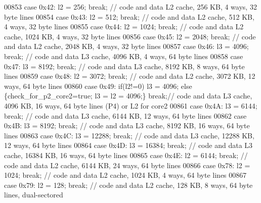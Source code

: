 \begin{DoxyCode}
{00853       \textcolor{keywordflow}{case} 0x42: l2 = 256; \textcolor{keywordflow}{break};   \textcolor{comment}{// code and data L2 cache, 256 KB, 4 ways, 32 byte lines}
00854       \textcolor{keywordflow}{case} 0x43: l2 = 512; \textcolor{keywordflow}{break};   \textcolor{comment}{// code and data L2 cache, 512 KB, 4 ways, 32 byte lines}
00855       \textcolor{keywordflow}{case} 0x44: l2 = 1024; \textcolor{keywordflow}{break};   \textcolor{comment}{// code and data L2 cache, 1024 KB, 4 ways, 32 byte lines}
00856       \textcolor{keywordflow}{case} 0x45: l2 = 2048; \textcolor{keywordflow}{break};   \textcolor{comment}{// code and data L2 cache, 2048 KB, 4 ways, 32 byte lines}
00857       \textcolor{keywordflow}{case} 0x46: l3 = 4096; \textcolor{keywordflow}{break};   \textcolor{comment}{// code and data L3 cache, 4096 KB, 4 ways, 64 byte lines}
00858       \textcolor{keywordflow}{case} 0x47: l3 = 8192; \textcolor{keywordflow}{break};   \textcolor{comment}{// code and data L3 cache, 8192 KB, 8 ways, 64 byte lines}
00859       \textcolor{keywordflow}{case} 0x48: l2 = 3072; \textcolor{keywordflow}{break};   \textcolor{comment}{// code and data L2 cache, 3072 KB, 12 ways, 64 byte lines}
00860       \textcolor{keywordflow}{case} 0x49: \textcolor{keywordflow}{if}(l2!=0) l3 = 4096; \textcolor{keywordflow}{else} \{check\_for\_p2\_core2=\textcolor{keyword}{true}; l3 = l2 = 4096;\} \textcolor{keywordflow}{break};\textcolor{comment}{// code and
       data L3 cache, 4096 KB, 16 ways, 64 byte lines (P4) or L2 for core2}
00861       \textcolor{keywordflow}{case} 0x4A: l3 = 6144; \textcolor{keywordflow}{break};   \textcolor{comment}{// code and data L3 cache, 6144 KB, 12 ways, 64 byte lines}
00862       \textcolor{keywordflow}{case} 0x4B: l3 = 8192; \textcolor{keywordflow}{break};   \textcolor{comment}{// code and data L3 cache, 8192 KB, 16 ways, 64 byte lines}
00863       \textcolor{keywordflow}{case} 0x4C: l3 = 12288; \textcolor{keywordflow}{break};   \textcolor{comment}{// code and data L3 cache, 12288 KB, 12 ways, 64 byte lines}
00864       \textcolor{keywordflow}{case} 0x4D: l3 = 16384; \textcolor{keywordflow}{break};   \textcolor{comment}{// code and data L3 cache, 16384 KB, 16 ways, 64 byte lines}
00865       \textcolor{keywordflow}{case} 0x4E: l2 = 6144; \textcolor{keywordflow}{break};   \textcolor{comment}{// code and data L2 cache, 6144 KB, 24 ways, 64 byte lines}
00866       \textcolor{keywordflow}{case} 0x78: l2 = 1024; \textcolor{keywordflow}{break};   \textcolor{comment}{// code and data L2 cache, 1024 KB, 4 ways, 64 byte lines}
00867       \textcolor{keywordflow}{case} 0x79: l2 = 128; \textcolor{keywordflow}{break};   \textcolor{comment}{// code and data L2 cache, 128 KB, 8 ways, 64 byte lines, dual-sectored}
}
\end{DoxyCode}
